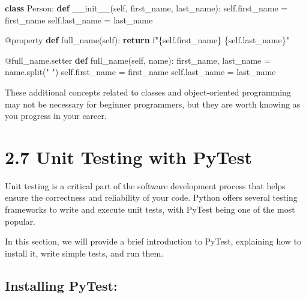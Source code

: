\documentclass[
  paper=a4,
  ,captions=tableheading
]{scrartcl}
\newenvironment{Shaded}{}{}
\newcommand{\AttributeTok}[1]{\textcolor[rgb]{0.49,0.56,0.16}{#1}}
\newcommand{\ControlFlowTok}[1]{\textcolor[rgb]{0.00,0.44,0.13}{\textbf{#1}}}
\newcommand{\FunctionTok}[1]{\textcolor[rgb]{0.02,0.16,0.49}{#1}}
\newcommand{\KeywordTok}[1]{\textcolor[rgb]{0.00,0.44,0.13}{\textbf{#1}}}
\newcommand{\NormalTok}[1]{#1}
\newcommand{\OperatorTok}[1]{\textcolor[rgb]{0.40,0.40,0.40}{#1}}
\newcommand{\SpecialCharTok}[1]{\textcolor[rgb]{0.25,0.44,0.63}{#1}}
\newcommand{\SpecialStringTok}[1]{\textcolor[rgb]{0.73,0.40,0.53}{#1}}
\newcommand{\StringTok}[1]{\textcolor[rgb]{0.25,0.44,0.63}{#1}}
\newcommand{\VariableTok}[1]{\textcolor[rgb]{0.10,0.09,0.49}{#1}}
\begin{document}
\begin{Shaded}
\begin{Highlighting}[]

\KeywordTok{class}\NormalTok{ Person:}
    \KeywordTok{def} \FunctionTok{\_\_init\_\_}\NormalTok{(}\VariableTok{self}\NormalTok{, first\_name, last\_name):}
        \VariableTok{self}\NormalTok{.first\_name }\OperatorTok{=}\NormalTok{ first\_name}
        \VariableTok{self}\NormalTok{.last\_name }\OperatorTok{=}\NormalTok{ last\_name}

    \AttributeTok{@property}
    \KeywordTok{def}\NormalTok{ full\_name(}\VariableTok{self}\NormalTok{):}
        \ControlFlowTok{return} \SpecialStringTok{f"}\SpecialCharTok{\{}\VariableTok{self}\SpecialCharTok{.}\NormalTok{first\_name}\SpecialCharTok{\}}\SpecialStringTok{ }\SpecialCharTok{\{}\VariableTok{self}\SpecialCharTok{.}\NormalTok{last\_name}\SpecialCharTok{\}}\SpecialStringTok{"}

    \AttributeTok{@full\_name.setter}
    \KeywordTok{def}\NormalTok{ full\_name(}\VariableTok{self}\NormalTok{, name):}
\NormalTok{        first\_name, last\_name }\OperatorTok{=}\NormalTok{ name.split(}\StringTok{" "}\NormalTok{)}
        \VariableTok{self}\NormalTok{.first\_name }\OperatorTok{=}\NormalTok{ first\_name}
        \VariableTok{self}\NormalTok{.last\_name }\OperatorTok{=}\NormalTok{ last\_name}
\end{Highlighting}
\end{Shaded}

These additional concepts related to classes and object-oriented
programming may not be necessary for beginner programmers, but they are
worth knowing as you progress in your career.

\hypertarget{unit-testing-with-pytest}{%
\section{2.7 Unit Testing with PyTest}\label{unit-testing-with-pytest}}

Unit testing is a critical part of the software development process that
helps ensure the correctness and reliability of your code. Python offers
several testing frameworks to write and execute unit tests, with PyTest
being one of the most popular.

In this section, we will provide a brief introduction to PyTest,
explaining how to install it, write simple tests, and run them.

\hypertarget{installing-pytest}{%
\subsection{Installing PyTest:}\label{installing-pytest}}
\end{document}
